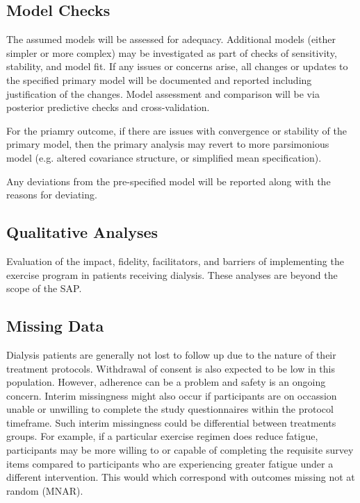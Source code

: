 \documentclass[11pt,parskip=half-]{scrartcl}
\begin{document}
\subsection{Model Checks}\label{model-checks}

The assumed models will be assessed for adequacy. Additional models (either simpler or more complex) may be investigated as part of checks of sensitivity, stability, and model fit. If any issues or concerns arise, all changes or updates to the specified primary model will be documented and reported including justification of the changes. Model assessment and comparison will be via posterior predictive checks and cross-validation.

For the priamry outcome, if there are issues with convergence or stability of the primary model, then the primary analysis may revert to more parsimonious model (e.g. altered covariance structure, or simplified mean specification).

Any deviations from the pre-specified model will be reported along with the reasons for deviating.

\subsection{Qualitative Analyses}\label{qualitative-analyses}

Evaluation of the impact, fidelity, facilitators, and barriers of implementing the exercise program in patients receiving dialysis. These analyses are beyond the scope of the SAP.

\subsection{Missing Data}\label{missing-data}

Dialysis patients are generally not lost to follow up due to the nature of their treatment protocols. Withdrawal of consent is also expected to be low in this population. However, adherence can be a problem and safety is an ongoing concern. Interim missingness might also occur if participants are on occassion unable or unwilling to complete the study questionnaires within the protocol timeframe. Such interim missingness could be differential between treatments groups. For example, if a particular exercise regimen does reduce fatigue, participants may be more willing to or capable of completing the requisite survey items compared to participants who are experiencing greater fatigue under a different intervention. This would which correspond with outcomes missing not at random (MNAR).
\end{document}
